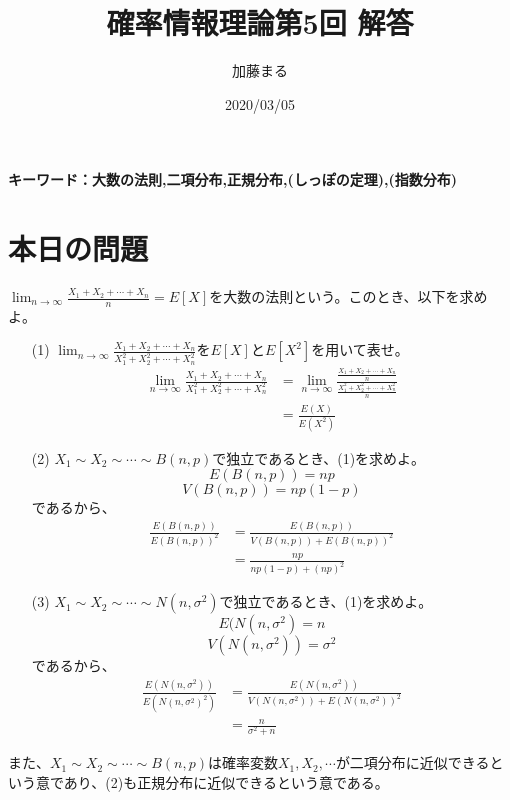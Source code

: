 \documentclass[a4j,uplatex,dvipdfmx]{jsarticle}
\title{確率情報理論第5回 解答}
\author{加藤まる}
\date{2020/03/05}
\begin{document}
\maketitle
\bf キーワード：大数の法則,二項分布,正規分布,(しっぽの定理),(指数分布)
\rm

\section*{本日の問題}
$\displaystyle \lim_{n \to \infty} \frac{X_1 + X_2 + \cdots +X_n}{n}=E[X]$を大数の法則という。このとき、以下を求めよ。
\begin{itemize}
  \item[(1)] $\displaystyle \lim_{n \to \infty} \frac{X_1 + X_2 + \cdots +X_n}{X_1^2 + X_2^2 + \cdots +X_n^2}$を$E[X]$と$E[X^2]$を用いて表せ。
  \begin{equation}
    \begin{split}
       \lim_{n \to \infty} \frac{X_1 + X_2 + \cdots +X_n}{X_1^2 + X_2^2 + \cdots +X_n^2} &= \lim_{n \to \infty} \frac{\frac {X_1 + X_2 + \cdots +X_n}{n}}{\frac{X_1^2 + X_2^2 + \cdots +X_n^2}{n}} \\
      &= \frac{E(X)}{E(X^2)}
    \end{split}
  \end{equation}
  \item[(2)] $X_1\sim X_2\sim \cdots \sim B(n,p)$で独立であるとき、(1)を求めよ。
  \begin{equation}
    E(B(n,p))=np 
  \end{equation}
  \begin{equation}
    V(B(n,p))=np(1-p)
  \end{equation}
  であるから、
  \begin{equation}
    \begin{split}
      \frac{E(B(n,p))}{E(B(n,p))^2} &= \frac{E(B(n,p))}{V(B(n,p))+E(B(n,p))^2} \\
      &= \frac{np}{np(1-p)+(np)^2}
    \end{split}
  \end{equation} 
  \item[(3)] $X_1\sim X_2\sim \cdots \sim N(n,\sigma ^2)$で独立であるとき、(1)を求めよ。
  \begin{equation}
    E(N(n,\sigma ^2) = n
  \end{equation} 
  \begin{equation}
    V(N(n,\sigma ^2)) = \sigma ^2
  \end{equation}
  であるから、
  \begin{equation}
    \begin{split}
      \frac{E(N(n,\sigma ^2))}{E(N(n,\sigma ^2)^2)} &= \frac{E(N(n,\sigma ^2))}{V(N(n,\sigma ^2))+E(N(n,\sigma ^2))^2} \\
      &= \frac{n}{\sigma ^2+ n}
    \end{split}
  \end{equation}
\end{itemize}
また、$X_1\sim X_2\sim \cdots \sim B(n,p)$は確率変数$X_1, X_2,\cdots$が二項分布に近似できるという意であり、(2)も正規分布に近似できるという意である。
\end{document}
